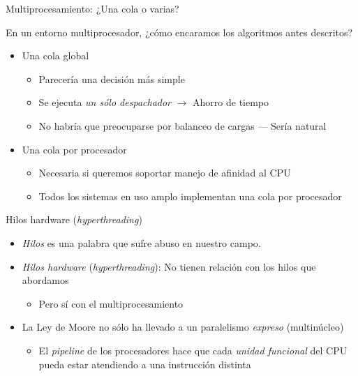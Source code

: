 \documentclass[presentation]{beamer}
\begin{document}
\begin{frame}[label={sec:org2637275}]{Multiprocesamiento: ¿Una cola o varias?}
\begin{center}
En un entorno multiprocesador, ¿cómo encaramos los algoritmos antes
descritos?
\end{center}
\begin{itemize}
\item Una cola global
\begin{itemize}
\item Parecería una decisión más simple
\item Se ejecuta \emph{un sólo despachador} \(\rightarrow\) Ahorro de tiempo
\item No habría que preocuparse por balanceo de cargas — Sería natural
\end{itemize}
\item Una cola por procesador
\begin{itemize}
\item Necesaria si queremos soportar manejo de afinidad al CPU
\item Todos los sistemas en uso amplo implementan una cola por procesador
\end{itemize}
\end{itemize}
\end{frame}

\begin{frame}[label={sec:org755b8cf}]{Hilos hardware (\emph{hyperthreading})}
\begin{itemize}
\item \emph{Hilos} es una palabra que sufre abuso en nuestro campo.
\item \emph{Hilos hardware} (\emph{hyperthreading}): No tienen relación con los
hilos que abordamos
\begin{itemize}
\item Pero sí con el multiprocesamiento
\end{itemize}
\item La Ley de Moore no sólo ha llevado a un paralelismo \emph{expreso} (multinúcleo)
\begin{itemize}
\item El \emph{pipeline} de los procesadores hace que cada \emph{unidad
funcional} del CPU pueda estar atendiendo a una instrucción
distinta
\end{itemize}
\end{itemize}
\end{frame}
\end{document}
